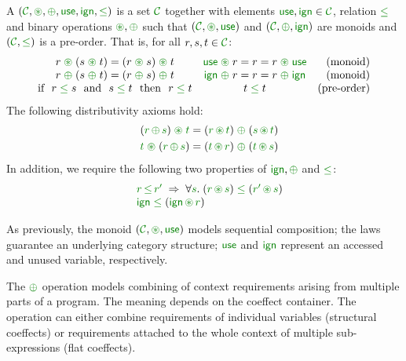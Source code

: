 \begin{definition}
A \emph{} $(\C, \cseq, \cpar, \cunit, \czero, \cleq)$ is a set 
$\C$ together with elements $\cunit, \czero \in \C$, relation $\cleq$ and binary operations 
$\cseq, \cpar$ such that $(\C, \cseq, \cunit)$ and $(\C, \cpar, \czero)$ are monoids and
$(\C, \cleq)$ is a pre-order. That is, for all $r,s,t\in \C$:
%
\begin{equation*}
\begin{array}{ccr}
r \;\cseq\; (s \;\cseq\; t) = (r \;\cseq\; s) \;\cseq\; t  &
\cunit \;\cseq\; r = r = r \;\cseq\; \cunit &
\textnormal{(monoid)}   
\\
r \;\cpar\; (s \;\cpar\; t) = (r \;\cpar\; s) \;\cpar\; t &
\czero \;\cpar\; r = r = r \;\cpar\; \czero &
\textnormal{(monoid)}   
\\
\textnormal{if}~~r\; \cleq\; s ~~\textnormal{and}~~s\; \cleq\; t~~\textnormal{then}~~r\; \cleq\; t&
t\; \cleq\; t &
\textnormal{(pre-order)}   
\\
\end{array}
\end{equation*}
%
The following distributivity axioms hold:
\begin{align*}
\quad (\cclrd{r}\, \cpar\, \cclrd{s}) \;\cseq\; \cclrd{t} & = (\cclrd{r} \,\cseq\, \cclrd{t}) \;\cpar\; (\cclrd{s}\, \cseq\, \cclrd{t}) \\
\quad \cclrd{t} \;\cseq\; (\cclrd{r}\, \cpar\, \cclrd{s}) & = (\cclrd{t} \,\cseq\, \cclrd{r}) \;\cpar\; (\cclrd{t}\, \cseq\, \cclrd{s})
\end{align*}
%
In addition, we require the following two properties of $\czero, \cpar$ and $\cleq$:
\begin{equation*}
\begin{array}{l}
 \quad \cclrd{r}\,\cleq\,\cclrd{r'} \; \Rightarrow \; \forall\cclrd{s}.\;(\cclrd{r}\,\cseq\,\cclrd{s})\;\cleq\;(\cclrd{r'}\,\cseq\,\cclrd{s}) \\
 \quad \czero\;\cleq\;(\czero\,\cseq\,\cclrd{r})
\end{array}
\end{equation*}
\end{definition}

\noindent
As previously, the monoid $(\C,\cseq,\cunit)$ models sequential composition; the laws guarantee
an underlying category structure; $\cunit$ and $\czero$ represent an accessed and unused variable, 
respectively.

The $\cpar$ operation models combining of context requirements arising from multiple parts of a 
program. The meaning depends on the coeffect container. The operation can either combine requirements
of individual variables (structural coeffects) or requirements attached to the whole context of 
multiple sub-exp\-ressions (flat coeffects).

